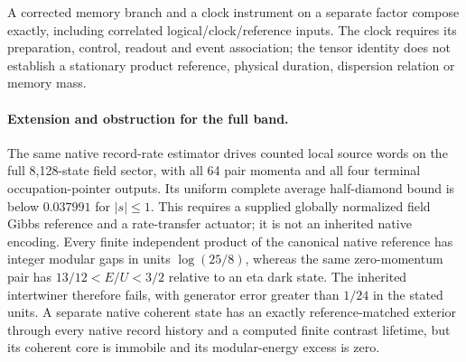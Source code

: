 A corrected memory branch and a clock instrument on a separate factor
compose exactly, including correlated logical/clock/reference inputs.
The clock requires its preparation, control, readout and event association;
the tensor identity does not establish a stationary product reference,
physical duration, dispersion relation or memory mass.

\paragraph{Extension and obstruction for the full band.}
The same native record-rate estimator drives counted local source words on
the full 8,128-state field sector, with all 64 pair momenta and all four
terminal occupation-pointer outputs. Its uniform complete average
half-diamond bound is below $0.037991$ for $|s|\le1$. This requires a supplied
globally normalized field Gibbs reference and a rate-transfer actuator;
it is not an inherited native encoding. Every finite independent product
of the canonical native reference has integer modular gaps in units
$\log(25/8)$, whereas the same zero-momentum pair has
$13/12<E/U<3/2$ relative to an eta dark state. The inherited intertwiner
therefore fails, with generator error greater than $1/24$ in the stated
units. A separate native coherent state has an exactly reference-matched
exterior through every native record history and a computed finite contrast
lifetime, but its coherent core is immobile and its modular-energy excess
is zero.
